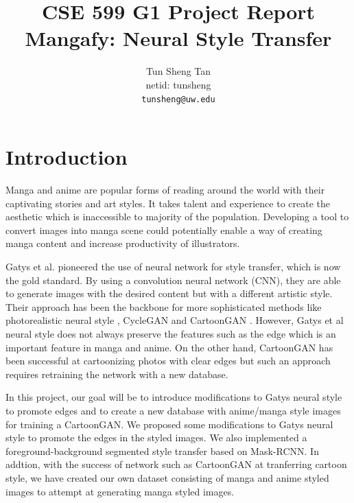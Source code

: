 \documentclass{article}
\title{CSE 599 G1 Project Report\\Mangafy: Neural Style Transfer}
\author{%
Tun Sheng Tan\\
netid: tunsheng\\
\texttt{tunsheng@uw.edu}
}
\begin{document}
\maketitle

\section{Introduction}

Manga and anime are popular forms of reading around the world with their captivating stories and art styles. It takes talent and experience to create the aesthetic which is inaccessible to majority of the population. Developing a tool to convert images into manga scene could potentially enable a way of creating manga content and increase productivity of illustrators.

Gatys et al. \cite{Gatys} pioneered the use of neural network for style transfer, which is now the gold standard. By using a convolution neural network (CNN), they are able to generate images with the desired content but with a different artistic style. Their approach has been the backbone for more sophisticated methods like photorealistic neural style \cite{luan2017deep}, CycleGAN \cite{CycleGAN} and CartoonGAN \cite{CartoonGAN}. However, Gatys et al neural style does not always preserve the features such as the edge which is an important feature in manga and anime. On the other hand, CartoonGAN has been successful at cartoonizing photos with clear edges but such an approach requires retraining the network with a new database.

In this project, our goal will be to introduce modifications to Gatys neural style to promote edges and to create a new database with anime/manga style images for training a CartoonGAN. We proposed some modifications to Gatys neural style to promote the edges in the styled images. We also implemented a foreground-background segmented style transfer based on Mask-RCNN\cite{MaskRCNN}. In addtion, with the success of network such as CartoonGAN at tranferring cartoon style, we have created our own dataset consisting of manga and anime styled images to attempt at generating manga styled images.
\end{document}
